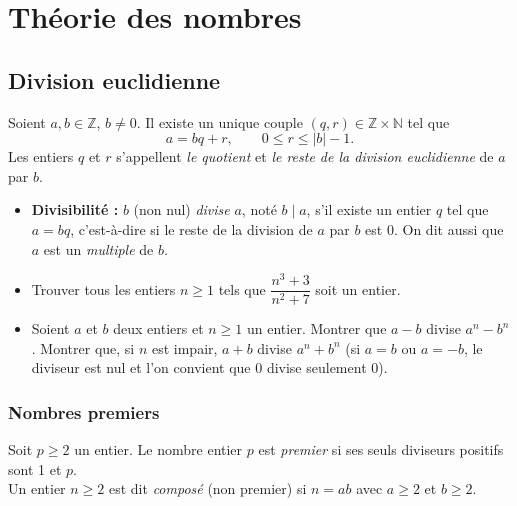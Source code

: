 \chapter{Théorie des nombres}


\section{Division euclidienne}

\begin{thm}
	Soient $a, b \in \mathbb{Z}$, $b \neq 0$. Il existe un unique couple $(q, r) \in \mathbb{Z} \times \mathbb{N}$ tel que
	\[
	a = bq + r, \qquad 0 \leq r \leq |b| - 1.
	\]
	Les entiers $q$ et $r$ s'appellent \textit{le quotient} et \textit{le reste de la division euclidienne} de $a$ par $b.$
\end{thm}

\begin{itemize}
	\item \textbf{Divisibilité :} $b$ (non nul) \textit{divise} $a$, noté $b \mid a$, s'il existe un entier $q$ tel que $a = bq$, c'est-à-dire si le reste de la division de $a$ par $b$ est $0.$ On dit aussi que $a$ est un \textit{multiple} de $b$.
\end{itemize}



\begin{exercise}
	\begin{itemize}
	\item[$\bullet$]Trouver tous les entiers $n \geq 1$ tels que $\dfrac{n^3 + 3}{n^2 + 7}$ soit un entier.



	\item[$\bullet$] Soient $a$ et $b$ deux entiers et $n \geq 1$ un entier. Montrer que $a - b$ divise $a^n - b^n$. Montrer que, si $n$ est impair, $a + b$ divise $a^n + b^n$ (si $a=b$ ou $a=-b$, le diviseur est nul et l'on convient que $0$ divise seulement $0$).
\end{itemize}
\end{exercise}
\subsection*{Nombres premiers}

\begin{defi}
	Soit $p \geq 2$ un entier. Le nombre entier $p$ est \textit{premier} si ses seuls diviseurs positifs sont 1 et $p$.\\
	\quad Un entier $n \geq 2$ est dit \textit{composé} (non premier) si $n = ab$ avec $a \geq 2$ et $b \geq 2$.
\end{defi}

